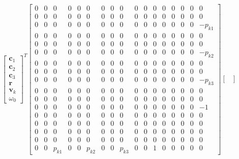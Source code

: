 \documentclass{article}
\newcommand{\mbf}[1]{\mathbf{#1}}
\begin{document}
\begin{align}
    \begin{bmatrix}
        \mbf{c}_1 \\
        \mbf{c}_2 \\
        \mbf{c}_3 \\
        \mbf{r} \\
        \mbf{v}_k \\
        \omega_0
    \end{bmatrix}^T 
    \begin{bmatrix}
        0 & 0 & 0 & 0 & 0 & 0 & 0 & 0 & 0 & 0 & 0 & 0 & 0 & 0 & 0 & 0 & 0 \\
        0 & 0 & 0 & 0 & 0 & 0 & 0 & 0 & 0 & 0 & 0 & 0 & 0 & 0 & 0 & 0 & 0 \\
        0 & 0 & 0 & 0 & 0 & 0 & 0 & 0 & 0 & 0 & 0 & 0 & 0 & 0 & 0 & 0 & -p_{k1} \\
        0 & 0 & 0 & 0 & 0 & 0 & 0 & 0 & 0 & 0 & 0 & 0 & 0 & 0 & 0 & 0 & 0 \\
        0 & 0 & 0 & 0 & 0 & 0 & 0 & 0 & 0 & 0 & 0 & 0 & 0 & 0 & 0 & 0 & 0 \\
        0 & 0 & 0 & 0 & 0 & 0 & 0 & 0 & 0 & 0 & 0 & 0 & 0 & 0 & 0 & 0 & -p_{k2} \\
        0 & 0 & 0 & 0 & 0 & 0 & 0 & 0 & 0 & 0 & 0 & 0 & 0 & 0 & 0 & 0 & 0 \\
        0 & 0 & 0 & 0 & 0 & 0 & 0 & 0 & 0 & 0 & 0 & 0 & 0 & 0 & 0 & 0 & 0 \\
        0 & 0 & 0 & 0 & 0 & 0 & 0 & 0 & 0 & 0 & 0 & 0 & 0 & 0 & 0 & 0 & -p_{k3} \\
        0 & 0 & 0 & 0 & 0 & 0 & 0 & 0 & 0 & 0 & 0 & 0 & 0 & 0 & 0 & 0 & 0 \\
        0 & 0 & 0 & 0 & 0 & 0 & 0 & 0 & 0 & 0 & 0 & 0 & 0 & 0 & 0 & 0 & 0 \\
        0 & 0 & 0 & 0 & 0 & 0 & 0 & 0 & 0 & 0 & 0 & 0 & 0 & 0 & 0 & 0 & -1 \\
        0 & 0 & 0 & 0 & 0 & 0 & 0 & 0 & 0 & 0 & 0 & 0 & 0 & 0 & 0 & 0 & 0 \\
        0 & 0 & 0 & 0 & 0 & 0 & 0 & 0 & 0 & 0 & 0 & 0 & 0 & 0 & 0 & 0 & 0 \\
        0 & 0 & 0 & 0 & 0 & 0 & 0 & 0 & 0 & 0 & 0 & 0 & 0 & 0 & 0 & 0 & 0 \\
        0 & 0 & 0 & 0 & 0 & 0 & 0 & 0 & 0 & 0 & 0 & 0 & 0 & 0 & 0 & 0 & 0 \\
        0 & 0 & p_{k1} & 0 & 0 & p_{k2} & 0 & 0 & p_{k3} & 0 & 0 & 1 & 0 & 0 & 0 & 0 & 0
    \end{bmatrix}
    \begin{bmatrix}

\end{bmatrix}
\end{align}
\end{document}
